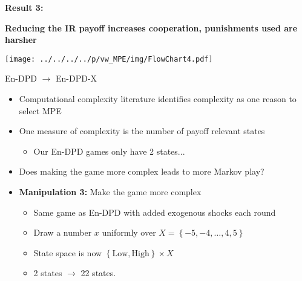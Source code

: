 \documentclass{beamer}
\begin{document}

\begin{frame}


\textbf{Result 3: }



\textbf{Reducing the IR payoff increases cooperation, punishments
used are harsher}
\end{frame}

\begin{frame}


\begin{center}\texttt{[image: ../../../../p/vw\_MPE/img/FlowChart4.pdf]}
\end{center}
\end{frame}


\begin{frame}{En-DPD $\rightarrow$ En-DPD-X}
\begin{itemize}
\item Computational complexity literature identifies complexity as one reason
to select MPE
\item One measure of complexity is the number of payoff relevant states

\begin{itemize}
\item Our En-DPD games only have 2 states...
\end{itemize}
\item Does making the game more complex leads to more Markov play?\pause
\item \textbf{Manipulation 3:} Make the game more complex

\begin{itemize}
\item Same game as En-DPD with added exogenous shocks each round
\item Draw a number $x$ uniformly over $X=\left\{ -5,-4,\ldots,4,5\right\} $
\item State space is now $\left\{ \mbox{Low},\mbox{High}\right\} \times X$
\item 2 states $\rightarrow$ 22 states.
\end{itemize}
\end{itemize}
\end{frame}
\end{document}
